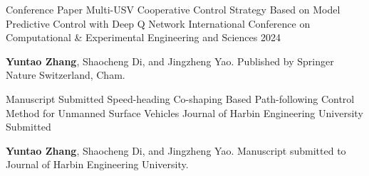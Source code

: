 

\begin{cventries}

  \cventry
    {Conference Paper}
    {Multi-USV Cooperative Control Strategy Based on Model Predictive Control with Deep Q Network}
    {International Conference on Computational \& Experimental Engineering and Sciences}
    {2024}
    {
      \begin{cvitems}
        \item {\textbf{Yuntao Zhang}, Shaocheng Di, and Jingzheng Yao. Published by Springer Nature Switzerland, Cham.}
      \end{cvitems}
    }

  \cventry
    {Manuscript Submitted}
    {Speed-heading Co-shaping Based Path-following Control Method for Unmanned Surface Vehicles}
    {Journal of Harbin Engineering University}
    {Submitted}
    {
      \begin{cvitems}
        \item {\textbf{Yuntao Zhang}, Shaocheng Di, and Jingzheng Yao. Manuscript submitted to Journal of Harbin Engineering University.}
      \end{cvitems}
    }

\end{cventries}
